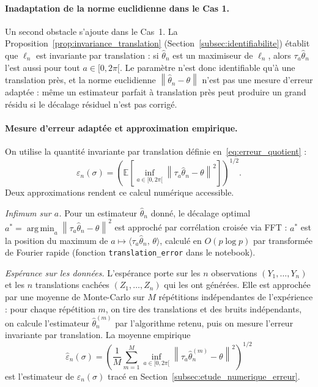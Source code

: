 \documentclass[12pt, a4paper]{article}
\theoremstyle{definition}
\newcommand{\E}{\mathbb{E}}
\newcommand{\norm}[1]{\left\|#1\right\|}
\DeclareMathOperator*{\argmin}{arg\,min}
\begin{document}
\paragraph{Inadaptation de la norme euclidienne dans le Cas 1.}
Un second obstacle s'ajoute dans le Cas~1. La
Proposition~\ref{prop:invariance_translation} (Section~\ref{subsec:identifiabilite})
établit que $\ell_n$ est invariante par translation : si $\hat\theta_n$ est un
maximiseur de $\ell_n$, alors $\tau_a\hat\theta_n$ l'est aussi pour tout
$a \in [0, 2\pi[$. Le paramètre n'est donc identifiable qu'à une translation
près, et la norme euclidienne $\norm{\hat\theta_n - \theta}$ n'est pas une
mesure d'erreur adaptée : même un estimateur parfait à translation près peut
produire un grand résidu si le décalage résiduel n'est pas corrigé.

\paragraph{Mesure d'erreur adaptée et approximation empirique.}
On utilise la quantité invariante par translation définie en~\eqref{eq:erreur_quotient} :
\[
    \varepsilon_n(\sigma)
    = \left(\E\!\left[\inf_{a \in [0,2\pi[}
      \norm{\tau_a\hat\theta_n - \theta}^2\right]\right)^{1/2}.
\]
Deux approximations rendent ce calcul numérique accessible.

\textit{Infimum sur $a$.}
Pour un estimateur $\hat\theta_n$ donné, le décalage optimal
$a^* = \argmin_{a}\norm{\tau_a\hat\theta_n - \theta}^2$ est approché par
corrélation croisée via FFT : $a^*$ est la position du maximum de
$a \mapsto \langle\tau_a\hat\theta_n,\,\theta\rangle$, calculé en $O(p\log p)$
par transformée de Fourier rapide (fonction \texttt{translation\_error} dans
le notebook).

\textit{Espérance sur les données.}
L'espérance porte sur les $n$ observations $(Y_1, \ldots, Y_n)$ et les $n$
translations cachées $(Z_1, \ldots, Z_n)$ qui les ont générées. Elle est
approchée par une moyenne de Monte-Carlo sur $M$ répétitions indépendantes
de l'expérience : pour chaque répétition $m$, on tire des translations et
des bruits indépendants, on calcule l'estimateur $\hat\theta_n^{(m)}$ par
l'algorithme retenu, puis on mesure l'erreur invariante par translation.
La moyenne empirique
\begin{equation}
    \widehat\varepsilon_n(\sigma)
    = \left(\frac{1}{M}\sum_{m=1}^{M}
      \inf_{a \in [0,2\pi[}\norm{\tau_a\hat\theta_n^{(m)} - \theta}^2
      \right)^{1/2}
    \label{eq:erreur_empirique}
\end{equation}
est l'estimateur de $\varepsilon_n(\sigma)$ tracé en
Section~\ref{subsec:etude_numerique_erreur}.
\end{document}
